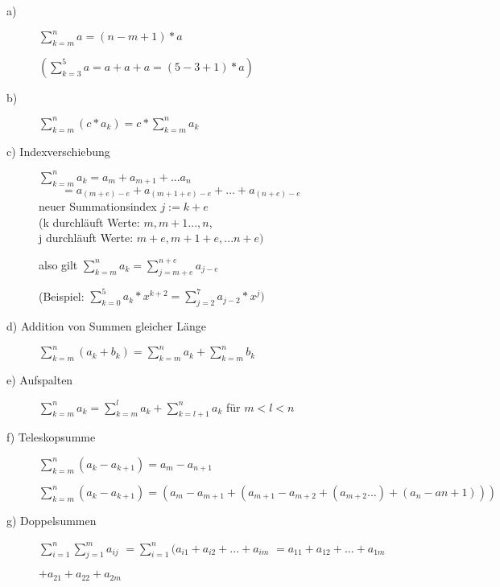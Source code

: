 \documentclass[a4paper, 12pt, twoside] {article}
\begin{document}
\begin{description}
	\item[a)] \hfill

	$\sum_{k=m}^{n} a = (n - m+ 1) * a$

	$(\sum_{k=3}^{5} a = a + a + a = (5-3+1)*a)$

	\item[b)] \hfill

	$\sum_{k=m}^{n} (c * a_k) = c * \sum_{k=m}^{n} a_k$

	\item[c) Indexverschiebung] \hfill

	$\sum_{k=m}^{n} a_k = a_m + a_{m+1} + ... a_n$ \\
	$\qquad = a_{(m + e) - e} + a_{(m+1+e)-e} + ... + a_{(n+e)-e}$ \\
	neuer Summationsindex $j := k +e$ \\
	(k durchläuft Werte: $m, m+1 ..., n$, \\
	j durchläuft Werte: $m + e, m+1+e, ... n+e)$

	also gilt
	$\sum_{k=m}^{n} a_k = \sum_{j = m+e}^{n+e} a_{j-e}$

	(Beispiel:
	$\sum_{k=0}^{5} a_k * x^{k+2} = \sum_{j = 2}^{7} a_{j-2} * x^j)$

	\item[d) Addition von Summen gleicher Länge] \hfill

	$\sum_{k=m}^{n} (a_k + b_k) = \sum_{k=m}^{n} a_k + \sum_{k=m}^{n} b_k$

	\item[e) Aufspalten] \hfill

	$\sum_{k=m}^{n} a_k = \sum_{k=m}^{l} a_k + \sum_{k=l+1}^{n} a_k$ für  $m < l < n$

	\item[f) Teleskopsumme] \hfill

	$\sum_{k=m}^{n} (a_k - a_{k+1}) = a_m - a_{n+1}$

	$\sum_{k=m}^{n} (a_k - a_{k+1}) = (a_m - a_{m+1} + (a_{m+1} - a_{m+2} + (a_{m+2} ... ) + (a_n - a{n+1})))$ %

	\item[g) Doppelsummen] \hfill

	$\sum_{i=1}^{n} \sum_{j=1}^{m} a_{ij}$
	$= \sum_{i=1}^{n} (a_{i1} + a_{i2} + ... + a_{im}$
	$= a_{11} + a_{12} + ... + a_{1m}$ %

	$+ a_{21} + a_{22} + a_{2m}$

\end{description}
\end{document}
